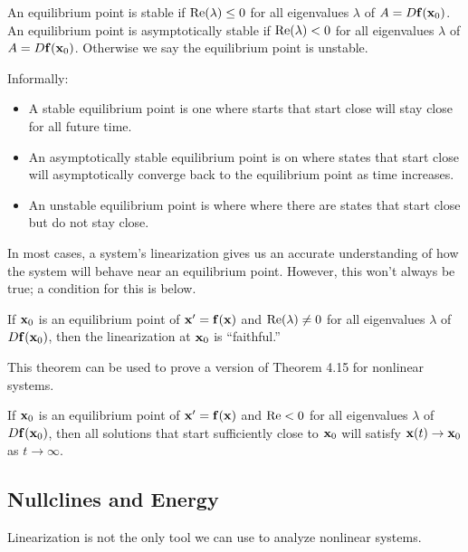 \documentclass[../m082main.tex]{subfiles}
\begin{document}
\begin{definition}
    An equilibrium point is stable if $\textrm{Re} (\lambda) \leq 0$ for all eigenvalues $\lambda$ of $A = D \mathbf{f} (\mathbf{x}_0)$.
    An equilibrium point is asymptotically stable if $\textrm{Re}(\lambda) < 0$ for all eigenvalues $\lambda$ of $A = D \mathbf{f} (\mathbf{x}_0)$.
    Otherwise we say the equilibrium point is unstable.
\end{definition}

Informally:
\begin{itemize}
    \item A stable equilibrium point is one where starts that start close will stay close for all future time.
    \item An asymptotically stable equilibrium point is on where states that start close will asymptotically converge back to the equilibrium point as time increases.
    \item An unstable equilibrium point is where where there are states that start close but do not stay close.
\end{itemize}
In most cases, a system's linearization gives us an accurate understanding of how the system will behave near an equilibrium point.
However, this won't always be true; a condition for this is below.

\begin{theorem}
    If $\mathbf{x}_0$ is an equilibrium point of $\mathbf{x}'= \mathbf{f}(\mathbf{x})$ and $\textrm{Re} (\lambda) \neq 0$ for all eigenvalues $\lambda$ of $D \mathbf{f} (\mathbf{x}_0)$, then the linearization at $\mathbf{x}_0$ is ``faithful.''
\end{theorem}

This theorem can be used to prove a version of Theorem 4.15 for nonlinear systems.

\begin{theorem}
    If $\mathbf{x}_0$ is an equilibrium point of $\mathbf{x}' = \mathbf{f} (\mathbf{x})$ and $\textrm{Re} < 0$ for all eigenvalues $\lambda$ of $D \mathbf{f} (\mathbf{x}_0)$, then all solutions that start sufficiently close to $\mathbf{x}_0$ will satisfy $\mathbf{x}(t) \to \mathbf{x}_0$ as $t \to \infty$.
\end{theorem}

\subsection{Nullclines and Energy}
Linearization is not the only tool we can use to analyze nonlinear systems.
\end{document}
